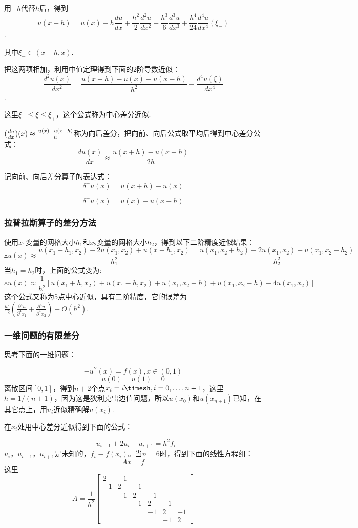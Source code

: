 \documentclass{article}
\begin{document}
用$-h$代替$h$后，得到
$$u(x-h)=u(x)-h\frac{du}{dx}+\frac{h^2}{2}\frac{d^2u}{dx^2}-\frac{h^3}{6}\frac{d^3u}{dx^3}+\frac{h^4}{24}\frac{d^4u}{dx^4}(\xi _-)$$.

其中$\xi _- \in (x-h,x)$.

把这两项相加，利用中值定理得到下面的$2$阶导数近似：
$$\frac{d^2u(x)}{dx^2}=\frac{u(x+h)-u(x)+u(x-h)}{h^2}-\frac{d^4u(\xi)}{dx^4}$$.

这里$\xi _-\le\xi\le\xi_+$，这个公式称为中心差分近似.

$(\frac{du}{dx})(x)\thickapprox \frac{u(x)-u(x-h)}{h}$称为向后差分，把向前、向后公式取平均后得到中心差分公式：
$$\frac{du(x)}{dx}\approx\frac{u(x+h)-u(x-h)}{2h}$$

记向前、向后差分算子的表达式：
$$\delta ^+ u(x)=u(x+h)-u(x)$$

$$\delta ^- u(x)=u(x)-u(x-h)$$


\subsubsection{拉普拉斯算子的差分方法}
使用$x_1$变量的网格大小$h_1$和$x_2$变量的网格大小$h_2$，得到以下二阶精度近似结果：
$$\vartriangle u(x)\approx\frac{u(x_1+h_1,x_2)-2u(x_1,x_2)+u(x-h_1,x_2)}{h^2 _1}+\frac{u(x_1,x_2+h_2)-2u(x_1,x_2)+u(x_1,x_2-h_2)}{h^2 _2}$$
当$h_1=h_2$时，上面的公式变为:
$$\vartriangle u(x)\approx\frac{1}{h^2}[u(x_1+h,x_2)+u(x_1-h,x_2)+u(x_1,x_2+h)+u(x_1,x_2-h)-4u(x_1,x_2)]$$
这个公式又称为5点中心近似，具有二阶精度，它的误差为$\frac{h^2}{12}(\frac{\partial^4 u}{\partial^4 x_1}+\frac{\partial^4 u}{\partial^4 x_2})+O(h^2)$.

\subsubsection{一维问题的有限差分}
思考下面的一维问题：

$$-u^{\prime\prime}(x)=f(x),x\in(0,1)$$
$$u(0)=u(1)=0$$
离散区间$[0,1]$，得到$n+2$个点$x_i=i\timesh,i=0,\ldots ,n+1$，这里$h=1/(n+1)$，因为这是狄利克雷边值问题，所以$u(x_0)$和$u(x_{n+1})$已知，在其它点上，用$u_i$近似精确解$u(x_i)$.

在$x_i$处用中心差分近似得到下面的公式：

$$-u_{i-1}+2u_i-u_{i+1}=h^2f_{i}$$
$u_i$，$u_{i-1}$，$u_{i+1}$是未知的，$f_i\equiv f(x_i)$。当$n=6$时，得到下面的线性方程组：
$$Ax=f$$
这里$$A=\frac{1}{h^2}\begin{bmatrix}
2 & {-1}\\
-1 & 2 & {-1}\\
 & {-1} & 2 & {-1}\\
 &  & {-1} & 2 & {-1}\\
 &  &  & {-1} & 2 & {-1}\\
 &  &  &  & {-1} & 2 
\end{bmatrix}$$
\end{document}
